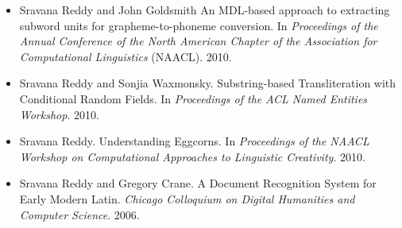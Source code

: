 \documentclass{res}
\begin{document}
\begin{resume}
\begin{itemize}[noitemsep]
\item Sravana Reddy and John Goldsmith  An MDL-based approach to extracting subword units for grapheme-to-phoneme conversion. In {\itshape Proceedings of the Annual Conference of the North American Chapter of the Association for Computational Linguistics} (NAACL). 2010.

\item Sravana Reddy and Sonjia Waxmonsky.  Substring-based Transliteration with Conditional Random Fields. In {\itshape Proceedings of the ACL Named Entities Workshop}. 2010.

\item Sravana Reddy. Understanding Eggcorns. In {\itshape Proceedings of the NAACL Workshop on Computational Approaches to Linguistic Creativity}. 2010.

\item Sravana Reddy and Gregory Crane. A Document Recognition System for Early Modern Latin. {\em Chicago Colloquium on Digital Humanities and Computer Science}. 2006.

\end{itemize}


\end{resume} 
\end{document}
